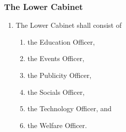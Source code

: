 \documentclass{scrartcl}
\begin{document}
            \subsubsection{The Lower Cabinet}
                \label{executive--cabinet--lower}
                \begin{enumerate}
                    \item The Lower Cabinet shall consist of
                        \begin{enumerate}
                            \item the Education Officer,
                            \item the Events Officer,
                            \item the Publicity Officer,
                            \item the Socials Officer,
                            \item the Technology Officer, and
                            \item the Welfare Officer.
                        \end{enumerate}
                \end{enumerate}
\end{document}
